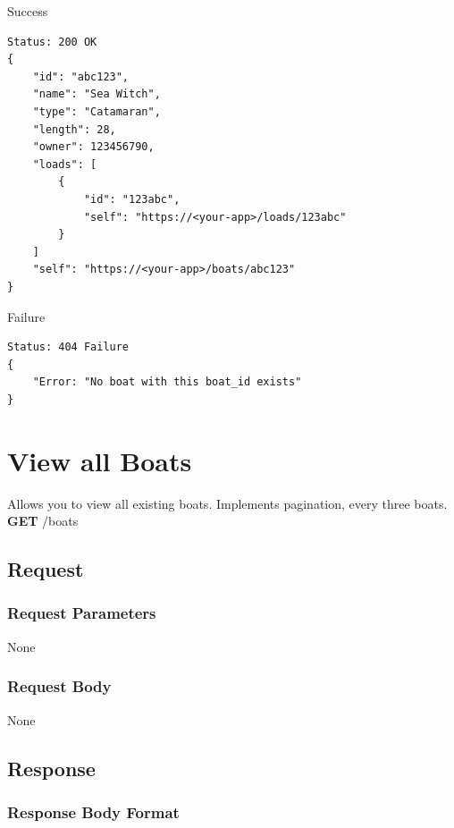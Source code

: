 \documentclass[letterpaper,11pt,titlepage,draftclsnofoot,onecolumn,compsoc,utf8,latin1]{IEEEtran}
\begin{document}
\begin{singlespace}
\noindent \Large{Success}

\begin{lstlisting}[]
Status: 200 OK
{
    "id": "abc123",
    "name": "Sea Witch",
    "type": "Catamaran",
    "length": 28,
    "owner": 123456790,
    "loads": [
        {
            "id": "123abc",
            "self": "https://<your-app>/loads/123abc"
        }
    ]
    "self": "https://<your-app>/boats/abc123"
}
\end{lstlisting}

\noindent \Large{Failure}

\begin{lstlisting}[]
Status: 404 Failure
{
    "Error: "No boat with this boat_id exists"
}
\end{lstlisting}

\newpage 

\normalsize

\section{View all Boats}

Allows you to view all existing boats. Implements pagination, every three boats.\\

\noindent \textbf{GET} /boats

\subsection{Request}

\subsubsection{Request Parameters}

None

\subsubsection{Request Body}

None

\subsection{Response}

\subsubsection{Response Body Format}


\end{singlespace}
\end{document}
